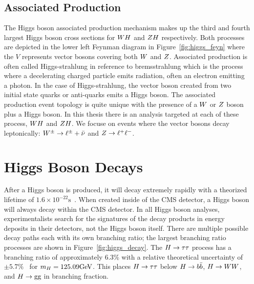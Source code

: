 \subsection{Associated Production}
The Higgs boson associated production mechanism makes up the third and fourth largest
Higgs boson cross sections for $WH$ and $ZH$ respectively. Both processes are 
depicted in the lower left Feynman diagram in Figure~\ref{fig:higgs_feyn} where
the $V$ represents vector bosons covering both $W$ and $Z$. Associated
production is often called Higgs-strahlung in reference to bremsstrahlung which is the
process where a decelerating charged particle emits radiation, often an electron
emitting a photon. In the case of Higgs-strahlung, the vector boson created 
from two initial state quarks or anti-quarks emits a Higgs boson. The associated
production event topology is quite unique with the presence of a $W$ or $Z$
boson plus a Higgs boson. In this thesis there is an analysis targeted at each
of these process, $WH$ and $ZH$. We focuse on events where the vector
bosons decay leptonically: $W^{\pm} \to \ell^{\pm} + \bar{\nu}$ and $Z \to \ell^{+}\ell^{-}$.



\section{Higgs Boson Decays}
\label{sec:higgs_decays}
After a Higgs boson is produced, it will decay extremely rapidly with a theorized lifetime
of $1.6 \times 10^{-22}\text{s}$~\cite{Dittmaier:2012vm}. When created
inside of the CMS detector, a Higgs boson will always decay
within the CMS detector. In all Higgs boson analyses, experimentalists search for the
signatures of the decay products in energy deposits in their detectors, not the Higgs
boson itself. There are multiple possible decay
paths each with its own branching ratio; the largest branching ratio
processes are shown in Figure~\ref{fig:higgs_decay}. The $H\to\tau\tau$ process has a branching
ratio of approximately 6.3\% with a relative theoretical uncertainty of 
$\pm5.7\%$~\cite{deFlorian:2016spz} for $m_{H} = 125.09\mathrm{GeV}$. This places $H\to\tau\tau$ below $H\to b\bar{b}$, 
$H\to WW$, and $H\to\text{g}\text{g}$ in branching fraction.

